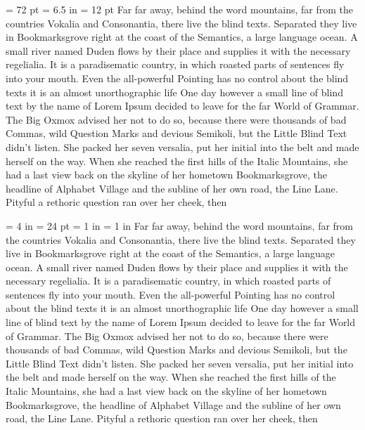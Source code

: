 \parindent = 72 pt
\hsize = 6.5 in
\baselineskip = 12 pt
 Far far away, behind the word mountains, far from the countries Vokalia and Consonantia, 
there live the blind texts. Separated they live in Bookmarksgrove right at the coast of 
the Semantics, a large language ocean. A small river named Duden flows by their place and 
supplies it with the necessary regelialia. It is a paradisematic country, in which roasted 
parts of sentences fly into your mouth. Even the all-powerful Pointing has no control about 
the blind texts it is an almost unorthographic life One day however a small line of blind text 
by the name of Lorem Ipsum decided to leave for the far World of Grammar. The Big Oxmox advised 
her not to do so, because there were thousands of bad Commas, wild Question Marks and devious Semikoli,
but the Little Blind Text didn’t listen. She packed her seven versalia, put her initial into the belt 
and made herself on the way. When she reached the first hills of the Italic Mountains, she had a 
last view back on the skyline of her hometown Bookmarksgrove, the headline of Alphabet Village and 
the subline of her own road, the Line Lane. Pityful a rethoric question ran over her cheek, then 

{
\hsize = 4 in
\parindent = 24 pt
\leftskip = 1 in
\parskip = 1 in
 Far far away, behind the word mountains, far from the countries Vokalia and Consonantia, 
there live the blind texts. Separated they live in Bookmarksgrove right at the coast of 
the Semantics, a large language ocean. A small river named Duden flows by their place and 
supplies it with the necessary regelialia. It is a paradisematic country, in which roasted 
parts of sentences fly into your mouth. Even the all-powerful Pointing has no control about 
the blind texts it is an almost unorthographic life One day however a small line of blind text 
by the name of Lorem Ipsum decided to leave for the far World of Grammar. The Big Oxmox advised 
her not to do so, because there were thousands of bad Commas, wild Question Marks and devious Semikoli,
but the Little Blind Text didn’t listen. She packed her seven versalia, put her initial into the belt 
and made herself on the way. When she reached the first hills of the Italic Mountains, she had a 
last view back on the skyline of her hometown Bookmarksgrove, the headline of Alphabet Village and 
the subline of her own road, the Line Lane. Pityful a rethoric question ran over her cheek, then 
\par
}

